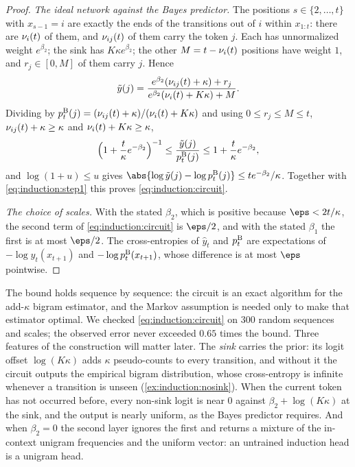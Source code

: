 \begin{refsection}
\begin{proof}
\emph{The ideal network against the Bayes predictor.} The positions $s\in\{2,\dots,t\}$ with $x_{s-1}=i$ are exactly the ends of the transitions out of $i$ within $x_{1:t}$: there are $\nu_i(t)$ of them, and $\nu_{ij}(t)$ of them carry the token $j$. Each has unnormalized weight $e^{\beta_2}$; the sink has $K\kappa e^{\beta_2}$; the other $M=t-\nu_i(t)$ positions have weight $1$, and $r_j\in[0,M]$ of them carry $j$. Hence
\[
  \tilde y(j)=\frac{e^{\beta_2}(\nu_{ij}(t)+\kappa)+r_j}{e^{\beta_2}(\nu_i(t)+K\kappa)+M} .
\]
Dividing by $p^{\mathrm{B}}_t(j)=(\nu_{ij}(t)+\kappa)/(\nu_i(t)+K\kappa)$ and using $0\le r_j\le M\le t$, $\nu_{ij}(t)+\kappa\ge\kappa$ and $\nu_i(t)+K\kappa\ge\kappa$,
\[
  \Bigl(1+\frac t\kappa e^{-\beta_2}\Bigr)^{-1}\le\frac{\tilde y(j)}{p^{\mathrm{B}}_t(j)}\le1+\frac t\kappa e^{-\beta_2},
\]
and $\log(1+u)\le u$ gives $\abs{\log\tilde y(j)-\log\indpb_t(j)}\le te^{-\beta_2}/\kappa$. Together with \eqref{eq:induction:step1} this proves \eqref{eq:induction:circuit}.

\emph{The choice of scales.} With the stated $\beta_2$, which is positive because $\eps<2t/\kappa$, the second term of \eqref{eq:induction:circuit} is $\eps/2$, and with the stated $\beta_1$ the first is at most $\eps/2$. The cross-entropies of $\hat y_t$ and $p^{\mathrm{B}}_t$ are expectations of $-\log\hat y_t(x_{t+1})$ and $-\log p^{\mathrm{B}}_t(x_{t+1})$, whose difference is at most $\eps$ pointwise.
\end{proof}

The bound holds sequence by sequence: the circuit is an exact algorithm for the add-$\kappa$ bigram estimator, and the Markov assumption is needed only to make that estimator optimal. We checked \eqref{eq:induction:circuit} on $300$ random sequences and scales; the observed error never exceeded $0.65$ times the bound. Three features of the construction will matter later. The \emph{sink} carries the prior: its logit offset $\log(K\kappa)$ adds $\kappa$ pseudo-counts to every transition, and without it the circuit outputs the empirical bigram distribution, whose cross-entropy is infinite whenever a transition is unseen (\cref{ex:induction:nosink}). When the current token has not occurred before, every non-sink logit is near $0$ against $\beta_2+\log(K\kappa)$ at the sink, and the output is nearly uniform, as the Bayes predictor requires. And when $\beta_2=0$ the second layer ignores the first and returns a mixture of the in-context unigram frequencies and the uniform vector: an untrained induction head is a unigram head.


\end{refsection}
